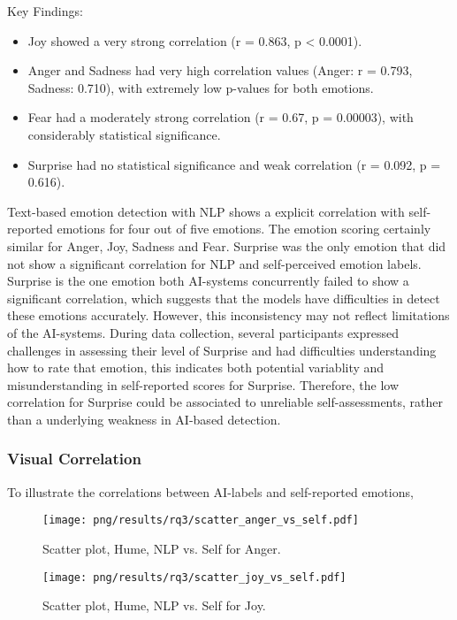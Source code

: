 Key Findings: 
\begin{itemize}
    \item Joy showed a very strong correlation (r = 0.863, p < 0.0001). 
    \item Anger and Sadness had very high correlation values (Anger: r = 0.793, Sadness: 0.710), with extremely low p-values for both emotions. 
    \item Fear had a moderately strong correlation (r = 0.67, p = 0.00003), with considerably statistical significance. 
    \item Surprise had no statistical significance and weak correlation (r = 0.092, p = 0.616). 
\end{itemize}
Text-based emotion detection with NLP shows a explicit correlation with self-reported emotions for four out of five emotions. The emotion scoring certainly similar for Anger, Joy, Sadness and Fear. 
Surprise was the only emotion that did not show a significant correlation for NLP and self-perceived emotion labels. Surprise is the one emotion both AI-systems concurrently failed to show a significant correlation, 
which suggests that the models have difficulties in detect these emotions accurately. However, this inconsistency may not reflect limitations of the 
AI-systems. During data collection, several participants expressed challenges in assessing their level of Surprise and had difficulties understanding how to rate that emotion, 
this indicates both potential variablity and misunderstanding in self-reported scores for Surprise. 
Therefore, the low correlation for Surprise could be associated to unreliable self-assessments, rather than a underlying weakness in AI-based detection. 


\subsubsection{Visual Correlation}
To illustrate the correlations between AI-labels and self-reported emotions, 
\begin{figure}[!h]
    \centering
    \texttt{[image: png/results/rq3/scatter\_anger\_vs\_self.pdf]}
    \caption{Scatter plot, Hume, NLP vs. Self for Anger.}
    \label{fig:scatter-anger-rq3}
\end{figure}

\begin{figure}[!h]
    \centering
    \texttt{[image: png/results/rq3/scatter\_joy\_vs\_self.pdf]}
    \caption{Scatter plot, Hume, NLP vs. Self for Joy.}
    \label{fig:scatter-joy-rq3}
\end{figure}


